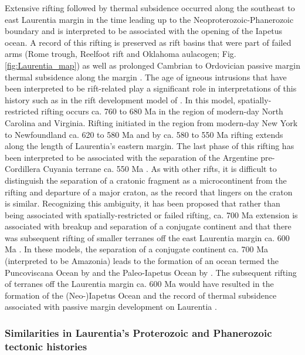 \documentclass[twocolumn, switch]{article} %
\begin{document}
Extensive rifting followed by thermal subsidence occurred along the southeast to east Laurentia margin in the time leading up to the Neoproterozoic-Phanerozoic boundary and is interpreted to be associated with the opening of the Iapetus ocean. A record of this rifting is preserved as rift basins that were part of failed arms (Rome trough, Reelfoot rift and Oklahoma aulacogen; Fig. \ref{fig:Laurentia_map}) as well as prolonged Cambrian to Ordovician passive margin thermal subsidence along the margin \citep{Bond1984a, Whitmeyer2007a}. The age of igneous intrusions that have been interpreted to be rift-related play a significant role in interpretations of this history such as in the rift development model of \citet{Burton2010a}. In this model, spatially-restricted rifting occurs ca. 760 to 680 Ma in the region of modern-day North Carolina and Virginia. Rifting initiated in the region from modern-day New York to Newfoundland ca. 620 to 580 Ma and by ca. 580 to 550 Ma rifting extends along the length of Laurentia's eastern margin. The last phase of this rifting has been interpreted to be associated with the separation of the Argentine pre-Cordillera Cuyania terrane ca. 550 Ma \citep{Dickerson1998a, Martin2019a}. As with other rifts, it is difficult to distinguish the separation of a cratonic fragment as a microcontinent from the rifting and departure of a major craton, as the record that lingers on the craton is similar. Recognizing this ambiguity, it has been proposed that rather than being associated with spatially-restricted or failed rifting, ca. 700 Ma extension is associated with breakup and separation of a conjugate continent and that there was subsequent rifting of smaller terranes off the east Laurentia margin ca. 600 Ma \citep{Chew2008a, Escayola2011a, Robert2020a}. In these models, the separation of a conjugate continent ca. 700 Ma (interpreted to be Amazonia) leads to the formation of an ocean termed the Puncoviscana Ocean by \citet{Escayola2011a} and the Paleo-Iapetus Ocean by \citet{Robert2020a}. The subsequent rifting of terranes off the Laurentia margin ca. 600 Ma would have resulted in the formation of the (Neo-)Iapetus Ocean and the record of thermal subsidence associated with passive margin development on Laurentia \citep{Escayola2011a, Robert2020a}.

\subsubsection{Similarities in Laurentia's Proterozoic and Phanerozoic tectonic histories}
\end{document}

